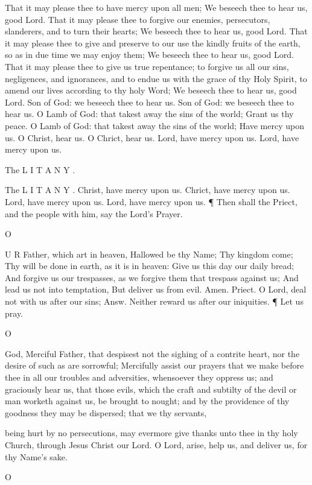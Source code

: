 That it may please thee to have mercy upon all men; We beseech thee to hear us, good Lord. That it may please thee to forgive our enemies, persecutors, slanderers, and to turn their hearts; We beseech thee to hear us, good Lord. That it may please thee to give and preserve to our use the kindly fruits of the earth, so as in due time we may enjoy them; We beseech thee to hear us, good Lord. That it may please thee to give us true repentance; to forgive us all our sins, negligences, and ignorances, and to endue us with the grace of thy Holy Spirit, to amend our lives according to thy holy Word; We beseech thee to hear us, good Lord. Son of God: we beseech thee to hear us. Son of God: we beseech thee to hear us. O Lamb of God: that takest away the sins of the world; Grant us thy peace. O Lamb of God: that takest away the sins of the world; Have mercy upon us. O Christ, hear us. O Chrict, hear us. Lord, have mercy upon us. Lord, have mercy upon us.

The L I T A N Y .

The L I T A N Y . Christ, have mercy upon us. Chrict, have mercy upon us. Lord, have mercy upon us. Lord, have mercy upon us. ¶ Then shall the Priect, and the people with him, say the Lord's Prayer.

O

U R Father, which art in heaven, Hallowed be thy Name; Thy kingdom come; Thy will be done in earth, as it is in heaven: Give us this day our daily bread; And forgive us our trespasses, as we forgive them that trespass against us; And lead us not into temptation, But deliver us from evil. Amen. Priect. O Lord, deal not with us after our sins; Answ. Neither reward us after our iniquities. ¶ Let us pray.

O

God, Merciful Father, that despisest not the sighing of a contrite heart, nor the desire of such as are sorrowful; Mercifully assist our prayers that we make before thee in all our troubles and adversities, whensoever they oppress us; and graciously hear us, that those evils, which the craft and subtilty of the devil or man worketh against us, be brought to nought; and by the providence of thy goodness they may be dispersed; that we thy servants,

being hurt by no persecutions, may evermore give thanks unto thee in thy holy Church, through Jesus Christ our Lord. O Lord, arise, help us, and deliver us, for thy Name's sake.

O

